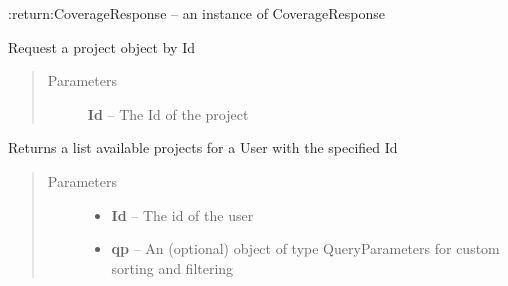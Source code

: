 \documentclass[letterpaper,10pt,english]{sphinxmanual}
\begin{document}
\begin{fulllineitems}
\begin{fulllineitems}
\begin{quote}
\begin{description}
\begin{itemize}
\end{itemize}

\end{description}\end{quote}

:return:CoverageResponse -- an instance of CoverageResponse

\end{fulllineitems}


\begin{fulllineitems}
\label{Available modules:BaseSpacePy.api.BaseSpaceAPI.BaseSpaceAPI.getProjectById}
Request a project object by Id
\begin{quote}\begin{description}
\item[{Parameters}] \leavevmode
\textbf{Id} -- The Id of the project

\end{description}\end{quote}

\end{fulllineitems}


\begin{fulllineitems}
\label{Available modules:BaseSpacePy.api.BaseSpaceAPI.BaseSpaceAPI.getProjectByUser}
Returns a list available projects for a User with the specified Id
\begin{quote}\begin{description}
\item[{Parameters}] \leavevmode\begin{itemize}
\item {} 
\textbf{Id} -- The id of the user

\item {} 
\textbf{qp} -- An (optional) object of type QueryParameters for custom sorting and filtering

\end{itemize}

\end{description}\end{quote}


\end{fulllineitems}
\end{fulllineitems}
\end{document}
